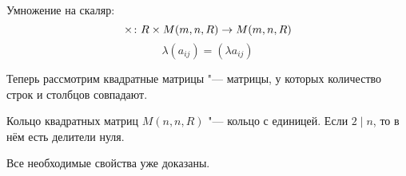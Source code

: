 \begin{Def}
Умножение на скаляр:
$$\times\colon R \times M(m, n, R) \rightarrow M(m, n, R)$$
$$\lambda (a_{ij}) = (\lambda a_{ij})$$
\end{Def}

Теперь рассмотрим квадратные матрицы "--- матрицы, у которых количество строк и столбцов совпадают.

\begin{theorem}{Кольцо квадратных матриц}
$M(n, n, R)$ "--- кольцо с единицей. Если $2 \mid n$, то в нём есть делители нуля.
\end{theorem}
Все необходимые свойства уже доказаны.